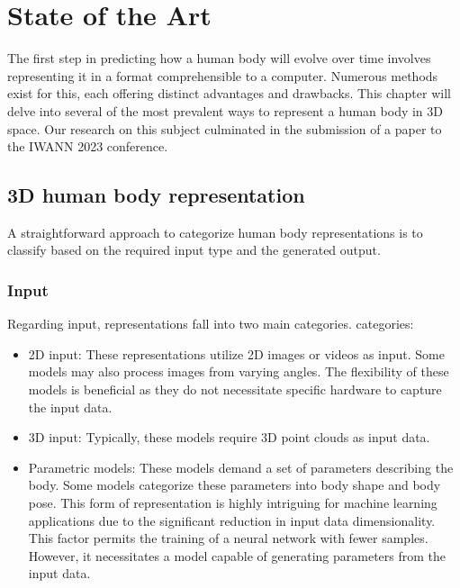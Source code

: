 
\chapter{State of the Art}\label{stateoftheart}

The first step in predicting how a human body will evolve over time involves
representing it in a format comprehensible to a computer. Numerous methods
exist for this, each offering distinct advantages and drawbacks. This chapter
will delve into several of the most prevalent ways to represent a human body in
3D space. Our research on this subject culminated in the submission of a paper
to the IWANN 2023 conference.

\section{3D human body representation}

A straightforward approach to categorize human body representations is to
classify based on the required input type and the generated output.

\subsection{Input}

Regarding input, representations fall into two main categories. categories:

\begin{itemize}
    \item 2D input: These representations utilize 2D images or videos as input. Some models may also process images from varying angles. The flexibility of these models is beneficial as they do not necessitate specific hardware to capture the input data.
    \item 3D input: Typically, these models require 3D point clouds as input data.
    \item Parametric models: These models demand a set of parameters describing the body.
          Some models categorize these parameters into body shape and body pose. This
          form of representation is highly intriguing for machine learning applications
          due to the significant reduction in input data dimensionality. This factor
          permits the training of a neural network with fewer samples. However, it
          necessitates a model capable of generating parameters from the input data.
\end{itemize}

